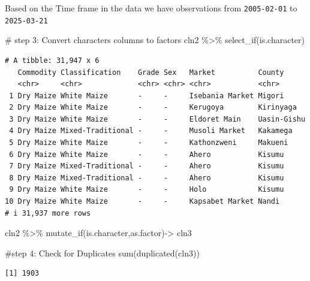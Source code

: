 \documentclass[
  letterpaper,
  DIV=11,
  numbers=noendperiod]{scrartcl}
\newenvironment{Shaded}{\begin{snugshade}}{\end{snugshade}}
\newcommand{\CommentTok}[1]{\textcolor[rgb]{0.37,0.37,0.37}{#1}}
\newcommand{\FunctionTok}[1]{\textcolor[rgb]{0.28,0.35,0.67}{#1}}
\newcommand{\NormalTok}[1]{\textcolor[rgb]{0.00,0.23,0.31}{#1}}
\newcommand{\OtherTok}[1]{\textcolor[rgb]{0.00,0.23,0.31}{#1}}
\newcommand{\SpecialCharTok}[1]{\textcolor[rgb]{0.37,0.37,0.37}{#1}}
\begin{document}
Based on the Time frame in the data we have observations from
\texttt{2005-02-01} to \texttt{2025-03-21}

\begin{Shaded}
\begin{Highlighting}[]
\CommentTok{\# step 3: Convert characters columns to factors}
\NormalTok{cln2 }\SpecialCharTok{\%\textgreater{}\%} \FunctionTok{select\_if}\NormalTok{(is.character)}
\end{Highlighting}
\end{Shaded}

\begin{verbatim}
# A tibble: 31,947 x 6
   Commodity Classification    Grade Sex   Market          County     
   <chr>     <chr>             <chr> <chr> <chr>           <chr>      
 1 Dry Maize White Maize       -     -     Isebania Market Migori     
 2 Dry Maize White Maize       -     -     Kerugoya        Kirinyaga  
 3 Dry Maize White Maize       -     -     Eldoret Main    Uasin-Gishu
 4 Dry Maize Mixed-Traditional -     -     Musoli Market   Kakamega   
 5 Dry Maize White Maize       -     -     Kathonzweni     Makueni    
 6 Dry Maize White Maize       -     -     Ahero           Kisumu     
 7 Dry Maize Mixed-Traditional -     -     Ahero           Kisumu     
 8 Dry Maize Mixed-Traditional -     -     Ahero           Kisumu     
 9 Dry Maize White Maize       -     -     Holo            Kisumu     
10 Dry Maize White Maize       -     -     Kapsabet Market Nandi      
# i 31,937 more rows
\end{verbatim}

\begin{Shaded}
\begin{Highlighting}[]
\NormalTok{cln2 }\SpecialCharTok{\%\textgreater{}\%} \FunctionTok{mutate\_if}\NormalTok{(is.character,as.factor)}\OtherTok{{-}\textgreater{}}\NormalTok{ cln3}
\end{Highlighting}
\end{Shaded}

\begin{Shaded}
\begin{Highlighting}[]
\CommentTok{\#step 4: Check for Duplicates}
\FunctionTok{sum}\NormalTok{(}\FunctionTok{duplicated}\NormalTok{(cln3))}
\end{Highlighting}
\end{Shaded}

\begin{verbatim}
[1] 1903
\end{verbatim}
\end{document}
